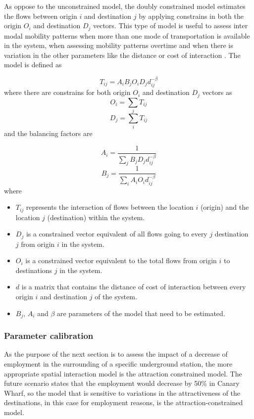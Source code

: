 \documentclass{article}
\begin{document}
As oppose to the unconstrained model, the doubly constrained model estimates the flows between origin $i$ and destination $j$ by applying constrains in both the origin $O_{i}$ and destination $D_{j}$ vectors. This type of model is useful to assess inter modal mobility patterns when more than one mode of transportation is available in the system, when assessing mobility patterns overtime and when there is variation in the other parameters like the distance or cost of interaction \citep{wilkinsonSpatialInteractionModelling2023}. The model is defined as

\[T_{ij} = A_i B_j O_i D_j d_{ij}^{-\beta}\] where there are constrains for both origin $O_{i}$ and destination $D_{j}$ vectors as \[O_i = \sum_j T_{ij}\] \[D_j = \sum_i T_{ij} \] and the balancing factors are

\[A_i = \frac{1}{\sum_j B_j D_j d_{ij}^{-\beta}}\]
\[B_j = \frac{1}{\sum_i A_i O_i d_{ij}^{-\beta}}\] where 

\begin{itemize}
  \item $T_{ij}$ represents the interaction of flows between the location $i$ (origin) and the location $j$ (destination) within the system. 
  \item $D_{j}$ is a constrained vector equivalent of all flows going to every $j$ destination $j$ from origin $i$ in the system.
  \item $O_{i}$ is a constrained vector equivalent to the total flows from origin $i$ to destinations $j$ in the system.
    \item $d$ is a matrix that contains the distance of cost of interaction between every origin $i$ and destination $j$ of the system.
    \item $B_{j}$, $A_{i}$ and $\beta$ are parameters of the model that need to be estimated.
\end{itemize}


\subsubsection{Parameter calibration}

As the purpose of the next section is to assess the impact of a decrease of employment in the surrounding of a specific underground station, the more appropriate spatial interaction model is the attraction constrained model. The future scenario states that the employment would decrease by 50\% in Canary Wharf, so the model that is sensitive to variations in the attractiveness of the destinations, in this case for employment reasons, is the attraction-constrained model.
\end{document}
